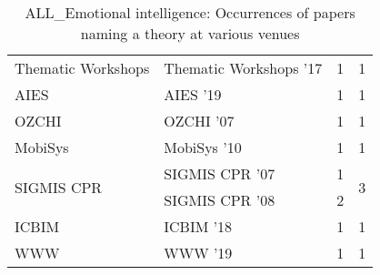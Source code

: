 \begin{table*}[t]
\begin{tabular}{llrr}
\multirow{1}{*}{Thematic Workshops } & Thematic Workshops '17 & 1 & \multirow{1}{*}{1}\\
\multirow{1}{*}{AIES } & AIES '19 & 1 & \multirow{1}{*}{1}\\
\multirow{1}{*}{OZCHI } & OZCHI '07 & 1 & \multirow{1}{*}{1}\\
\multirow{1}{*}{MobiSys } & MobiSys '10 & 1 & \multirow{1}{*}{1}\\
\multirow{2}{*}{SIGMIS CPR } & SIGMIS CPR '07 & 1 & \multirow{2}{*}{3}\\
& SIGMIS CPR '08 & 2 &\\
\multirow{1}{*}{ICBIM } & ICBIM '18 & 1 & \multirow{1}{*}{1}\\
\multirow{1}{*}{WWW } & WWW '19 & 1 & \multirow{1}{*}{1}\\
\end{tabular}
\caption{ALL\_Emotional intelligence: Occurrences of papers naming a theory at various venues}
\end{table*}